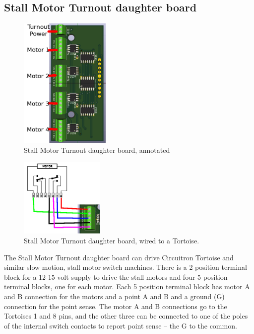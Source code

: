 \subsection{Stall Motor Turnout daughter board}
\label{sect:SM-Daughter}
\begin{figure}[hbpt]\begin{centering}%
\includegraphics[height=2.5in]{SM-DaughterBoard-Annotated.png}
\caption{Stall Motor Turnout daughter board, annotated}
\end{centering}\end{figure}
\begin{figure}[hbpt]\begin{centering}%
\includegraphics[height=1.5in]{SM-DaughterBoard-TortoiseWiring.png}
\caption{Stall Motor Turnout daughter board, wired to a Tortoise.}
\end{centering}\end{figure}


The Stall Motor Turnout daughter board can drive Circuitron Tortoise and
similar slow motion, stall motor switch machines. There is a 2 position
terminal block for a 12-15 volt supply to drive the stall motors and four 5
position terminal blocks, one for each motor. Each 5 position terminal block
has motor A and B connection for the motors and a point A and B and a ground
(G) connection for the point sense. The motor A and B connections go to the
Tortoises 1 and 8 pins, and the other three can be connected to one of the
poles of the internal switch contacts to report point sense -- the G to the
common.

